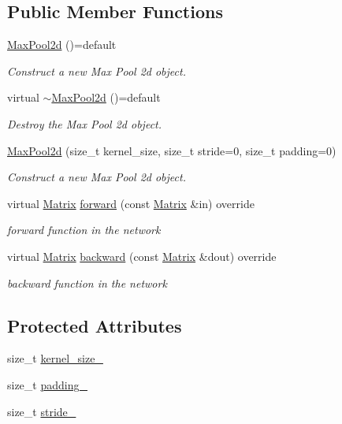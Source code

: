 \subsection*{Public Member Functions}
\begin{DoxyCompactItemize}
\item 
\mbox{\hyperlink{class_max_pool2d_adf1b59faff18335a4d8b7cdc9d9acad6}{Max\+Pool2d}} ()=default
\begin{DoxyCompactList}\small\item\em Construct a new Max Pool 2d object. \end{DoxyCompactList}\item 
virtual \mbox{\hyperlink{class_max_pool2d_a826785eceda78b54d150404ef24d23c3}{$\sim$\+Max\+Pool2d}} ()=default
\begin{DoxyCompactList}\small\item\em Destroy the Max Pool 2d object. \end{DoxyCompactList}\item 
\mbox{\hyperlink{class_max_pool2d_a5cfd5c6ae11f49fffb3d4a68f261f013}{Max\+Pool2d}} (size\+\_\+t kernel\+\_\+size, size\+\_\+t stride=0, size\+\_\+t padding=0)
\begin{DoxyCompactList}\small\item\em Construct a new Max Pool 2d object. \end{DoxyCompactList}\item 
virtual \mbox{\hyperlink{class_layer_a22b1e7286096aa62bd245536c8ebdaf1}{Matrix}} \mbox{\hyperlink{class_max_pool2d_a424de7878c64a058a8549362dae448f0}{forward}} (const \mbox{\hyperlink{class_layer_a22b1e7286096aa62bd245536c8ebdaf1}{Matrix}} \&in) override
\begin{DoxyCompactList}\small\item\em forward function in the network \end{DoxyCompactList}\item 
virtual \mbox{\hyperlink{class_layer_a22b1e7286096aa62bd245536c8ebdaf1}{Matrix}} \mbox{\hyperlink{class_max_pool2d_a05cc96411753ff4c0c79a1543af9e795}{backward}} (const \mbox{\hyperlink{class_layer_a22b1e7286096aa62bd245536c8ebdaf1}{Matrix}} \&dout) override
\begin{DoxyCompactList}\small\item\em backward function in the network \end{DoxyCompactList}\end{DoxyCompactItemize}
\subsection*{Protected Attributes}
\begin{DoxyCompactItemize}
\item 
size\+\_\+t \mbox{\hyperlink{class_max_pool2d_a665aa0f6561a8a7883d2746efeb68f88}{kernel\+\_\+size\+\_\+}}
\item 
size\+\_\+t \mbox{\hyperlink{class_max_pool2d_ab1dd4757718ee42e14bb7fdcf2a2be2c}{padding\+\_\+}}
\item 
size\+\_\+t \mbox{\hyperlink{class_max_pool2d_af8701b485ce94e4e3242a22e25350c80}{stride\+\_\+}}
\end{DoxyCompactItemize}


